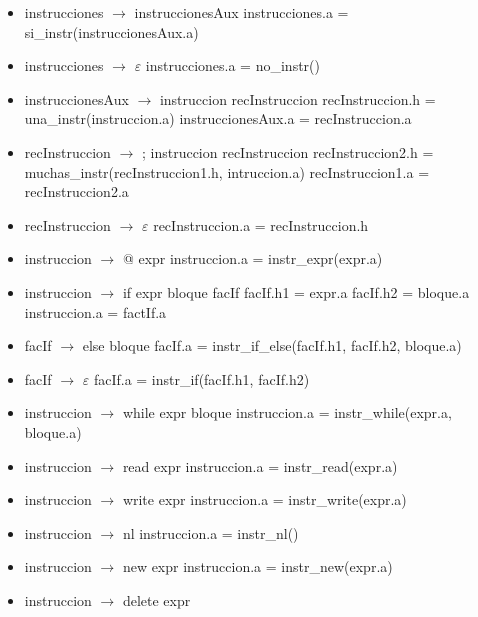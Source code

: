 \documentclass[11pt]{article}
\begin{document}
        \begin{itemize}
            \item instrucciones $\rightarrow$ instruccionesAux
                \subitem instrucciones.a = si\_instr(instruccionesAux.a)
            \item instrucciones $\rightarrow$ $\varepsilon$
                \subitem instrucciones.a = no\_instr()
            \item instruccionesAux $\rightarrow$ instruccion recInstruccion
                \subitem recInstruccion.h = una\_instr(instruccion.a)
                \subitem instruccionesAux.a = recInstruccion.a
            \item recInstruccion $\rightarrow$ ; instruccion recInstruccion
                \subitem recInstruccion2.h = muchas\_instr(recInstruccion1.h, intruccion.a)
                \subitem recInstruccion1.a = recInstruccion2.a
            \item recInstruccion $\rightarrow$ $\varepsilon$
                \subitem recInstruccion.a = recInstruccion.h
            \item instruccion $\rightarrow$ @ expr
                \subitem instruccion.a = instr\_expr(expr.a)
            \item instruccion $\rightarrow$ if expr bloque facIf
                \subitem facIf.h1 = expr.a
                \subitem facIf.h2 = bloque.a
                \subitem instruccion.a = factIf.a
            \item facIf $\rightarrow$ else bloque
                \subitem facIf.a = instr\_if\_else(facIf.h1, facIf.h2, bloque.a)
            \item facIf $\rightarrow$ $\varepsilon$
                \subitem facIf.a = instr\_if(facIf.h1, facIf.h2)
            \item instruccion $\rightarrow$ while expr bloque
                \subitem instruccion.a = instr\_while(expr.a, bloque.a)
            \item instruccion $\rightarrow$ read expr
                \subitem instruccion.a = instr\_read(expr.a)
            \item instruccion $\rightarrow$ write expr 
                \subitem instruccion.a = instr\_write(expr.a)
            \item instruccion $\rightarrow$ nl
                \subitem instruccion.a = instr\_nl()
            \item instruccion $\rightarrow$ new expr
                \subitem instruccion.a = instr\_new(expr.a)
            \item instruccion $\rightarrow$ delete expr

\end{itemize}
\end{document}
